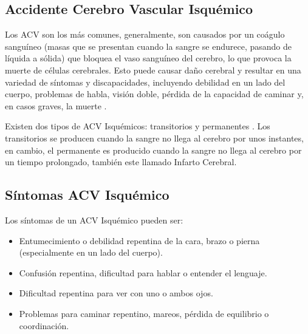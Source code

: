 \doublespacing
\subsection{Accidente Cerebro Vascular Isquémico}
\par Los ACV son los más comunes, generalmente, son causados por un coágulo sanguíneo (masas que se presentan cuando la sangre se endurece, pasando de líquida a sólida) que bloquea el vaso sanguíneo del cerebro, lo que provoca la muerte de células cerebrales. Esto puede causar daño cerebral y resultar en una variedad de síntomas y discapacidades, incluyendo debilidad en un lado del cuerpo, problemas de habla, visión doble, pérdida de la capacidad de caminar y, en casos graves, la muerte \cite{Adams1993}.\\
\par Existen dos tipos de ACV Isquémicos: transitorios y permanentes \cite{Garcia2019}. Los transitorios se producen cuando la sangre no llega al cerebro por unos instantes, en cambio, el permanente es producido cuando la sangre no llega al cerebro por un tiempo prolongado, también este llamado Infarto Cerebral. \\

\doublespacing
\subsection{Síntomas ACV Isquémico}
\par Los síntomas de un ACV Isquémico pueden ser:
	\begin{itemize}
		\item Entumecimiento o debilidad repentina de la cara, brazo o pierna (especialmente en un lado del cuerpo).
		\item Confusión repentina, dificultad para hablar o entender el lenguaje.
		\item Dificultad repentina para ver con uno o ambos ojos.
		\item Problemas para caminar repentino, mareos, pérdida de equilibrio o coordinación.\\
	\end{itemize}
	
\doublespacing
